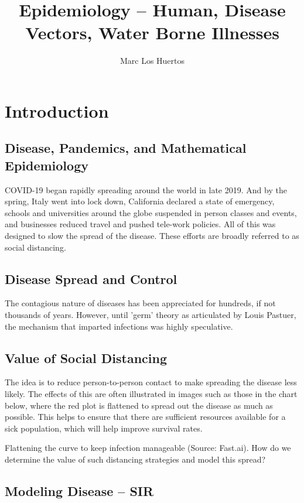 \documentclass{article}\usepackage[]{graphicx}\usepackage[]{color}
\title{Epidemiology -- Human, Disease Vectors, Water Borne Illnesses}
\author{Marc Los Huertos}
\begin{document}
\maketitle

\section{Introduction}

\subsection{Disease, Pandemics, and Mathematical Epidemiology}

COVID-19 began rapidly spreading around the world in late 2019. And by the spring, Italy went into lock down, California declared a state of emergency, schools and universities around the globe suspended in person classes and events, and businesses reduced travel and pushed tele-work policies. All of this was designed to slow the spread of the disease. These efforts are broadly referred to as social distancing.

\subsection{Disease Spread and Control}

The contagious nature of diseases has been appreciated for hundreds, if not thousands of years. However, until 'germ' theory as articulated by Louis Pastuer, the mechanism that imparted infections was highly speculative. 



\subsection{Value of Social Distancing}
The idea is to reduce person-to-person contact to make spreading the disease less likely. The effects of this are often illustrated in images such as those in the chart below, where the red plot is flattened to spread out the disease as much as possible. This helps to ensure that there are sufficient resources available for a sick population, which will help improve survival rates.

Flattening the curve to keep infection manageable (Source: Fast.ai).
How do we determine the value of such distancing strategies and model this spread?

\subsection{Modeling Disease -- SIR}
\end{document}
